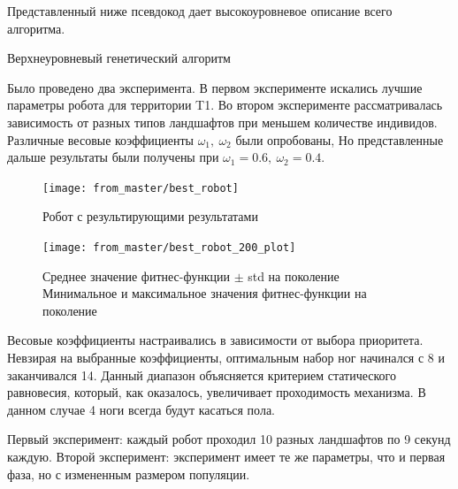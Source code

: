 Представленный ниже псевдокод дает высокоуровневое описание всего алгоритма.

\begin{algorithm}[H]
\caption{Верхнеуровневый генетический алгоритм\label{high_level}}
\end{algorithm}

Было проведено два эксперимента. В первом эксперименте искались лучшие параметры робота для территории T1. Во втором эксперименте рассматривалась зависимость от разных типов ландшафтов при меньшем количестве индивидов. Различные весовые коэффициенты $\omega_1,\ \omega_2$ были опробованы, Но представленные дальше результаты были получены при $\omega_1 = 0.6,\ \omega_2 = 0.4$. 



\begin{figure}[H]
    \centering\texttt{[image: from\_master/best\_robot]}\\
    \caption{Робот с результирующими результатами}
    \label{fig:best_robot}
    \end{figure}

    \begin{figure}[H]
    \centering\texttt{[image: from\_master/best\_robot\_200\_plot]}\\
    \caption{Среднее значение фитнес-функции $\pm$ std на поколение
    Минимальное и максимальное значения фитнес-функции на поколение}
    \label{fig:plot4}
    \end{figure}
    
    Весовые коэффициенты настраивались в зависимости от выбора приоритета. Невзирая на выбранные коэффициенты, оптимальным набор ног начинался с 8 и заканчивался 14. Данный диапазон объясняется критерием статического равновесия, который, как оказалось, увеличивает проходимость механизма. В данном случае 4 ноги всегда будут касаться пола. 
    
    Первый эксперимент: каждый робот проходил 10 разных ландшафтов по 9 секунд каждую. Второй эксперимент: эксперимент имеет те же параметры, что и первая фаза, но с измененным размером популяции. 
    
